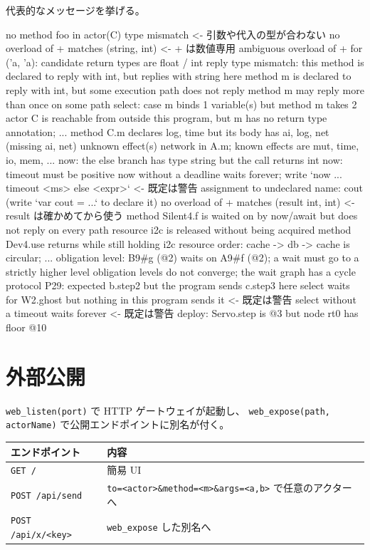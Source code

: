 \documentclass[11pt,a4paper]{ltjsarticle}
\begin{document}
代表的なメッセージを挙げる。

\begin{term}
no method foo in actor(C)
type mismatch                                  <- 引数や代入の型が合わない
no overload of + matches (string, int)         <- + は数値専用
ambiguous overload of + for ('a, 'a): candidate return types are float / int
reply type mismatch: this method is declared to reply with int,
  but replies with string here
method m is declared to reply with int, but some execution path does not reply
method m may reply more than once on some path
select: case m binds 1 variable(s) but method m takes 2
actor C is reachable from outside this program, but m has no return type
  annotation; ...
method C.m declares {log, time} but its body has {ai, log, net}
  (missing {ai, net})
unknown effect(s) network in A.m; known effects are mut, time, io, mem, ...
now: the else branch has type string but the call returns int
now: timeout must be positive
now without a deadline waits forever;
  write `now ... timeout <ms> else <expr>`      <- 既定は警告
assignment to undeclared name: cout (write `var cout = ...` to declare it)
no overload of + matches (result int, int)     <- result は確かめてから使う
method Silent4.f is waited on by now/await but does not reply on every path
resource i2c is released without being acquired
method Dev4.use returns while still holding i2c
resource order: cache -> db -> cache is circular; ...
obligation level: B9#g (@2) waits on A9#f (@2);
  a wait must go to a strictly higher level
obligation levels do not converge; the wait graph has a cycle
protocol P29: expected b.step2 but the program sends c.step3 here
select waits for W2.ghost but nothing in this program sends it   <- 既定は警告
select without a timeout waits forever                            <- 既定は警告
deploy: Servo.step is @3 but node rt0 has floor @10
\end{term}

\section{外部公開}
\label{sec:expose}

\texttt{web\_listen(port)} で HTTP ゲートウェイが起動し、
\texttt{web\_expose(path, actorName)} で公開エンドポイントに別名が付く。

\begin{center}
\begin{tabular}{@{}ll@{}}
\toprule
エンドポイント & 内容 \\
\midrule
\texttt{GET /}                & 簡易 UI \\
\texttt{POST /api/send}       & \texttt{to=<actor>\&method=<m>\&args=<a,b>} で任意のアクターへ \\
\texttt{POST /api/x/<key>}    & \texttt{web\_expose} した別名へ \\
\bottomrule
\end{tabular}
\end{center}
\end{document}
